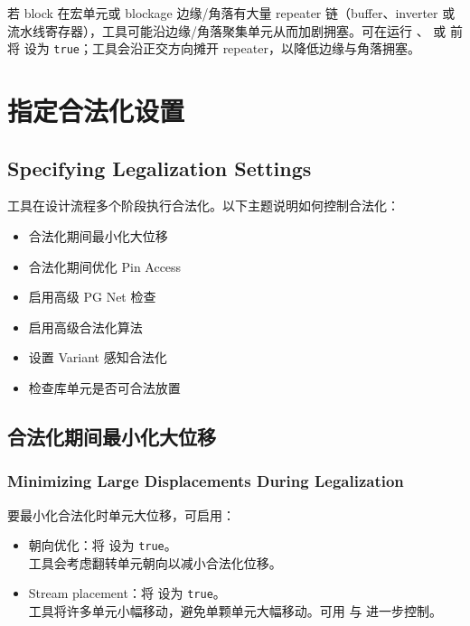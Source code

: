 若 block 在宏单元或 blockage 边缘/角落有大量 repeater 链（buffer、inverter 或流水线寄存器），工具可能沿边缘/角落聚集单元从而加剧拥塞。可在运行 、 或  前将  设为 \texttt{true}；工具会沿正交方向摊开 repeater，以降低边缘与角落拥塞。

\section{指定合法化设置}
\subsection*{Specifying Legalization Settings}

工具在设计流程多个阶段执行合法化。以下主题说明如何控制合法化：
\begin{itemize}
  \item 合法化期间最小化大位移
  \item 合法化期间优化 Pin Access
  \item 启用高级 PG Net 检查
  \item 启用高级合法化算法
  \item 设置 Variant 感知合法化
  \item 检查库单元是否可合法放置
\end{itemize}

\subsection{合法化期间最小化大位移}
\subsubsection*{Minimizing Large Displacements During Legalization}

要最小化合法化时单元大位移，可启用：
\begin{itemize}
  \item 朝向优化：将  设为 \texttt{true}。\\
        工具会考虑翻转单元朝向以减小合法化位移。
  \item Stream placement：将  设为 \texttt{true}。\\
        工具将许多单元小幅移动，避免单颗单元大幅移动。可用  与  进一步控制。
\end{itemize}

